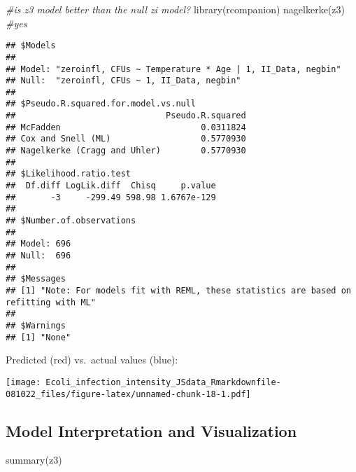 \documentclass[
]{article}
\newenvironment{Shaded}{\begin{snugshade}}{\end{snugshade}}
\newcommand{\CommentTok}[1]{\textcolor[rgb]{0.56,0.35,0.01}{\textit{#1}}}
\newcommand{\FunctionTok}[1]{\textcolor[rgb]{0.00,0.00,0.00}{#1}}
\newcommand{\NormalTok}[1]{#1}
\begin{document}
\begin{Shaded}
\begin{Highlighting}[]
\CommentTok{\#is z3 model better than the null zi model?}
\FunctionTok{library}\NormalTok{(rcompanion)}
\FunctionTok{nagelkerke}\NormalTok{(z3) }\CommentTok{\#yes}
\end{Highlighting}
\end{Shaded}

\begin{verbatim}
## $Models
##                                                                 
## Model: "zeroinfl, CFUs ~ Temperature * Age | 1, II_Data, negbin"
## Null:  "zeroinfl, CFUs ~ 1, II_Data, negbin"                    
## 
## $Pseudo.R.squared.for.model.vs.null
##                              Pseudo.R.squared
## McFadden                            0.0311824
## Cox and Snell (ML)                  0.5770930
## Nagelkerke (Cragg and Uhler)        0.5770930
## 
## $Likelihood.ratio.test
##  Df.diff LogLik.diff  Chisq     p.value
##       -3     -299.49 598.98 1.6767e-129
## 
## $Number.of.observations
##           
## Model: 696
## Null:  696
## 
## $Messages
## [1] "Note: For models fit with REML, these statistics are based on refitting with ML"
## 
## $Warnings
## [1] "None"
\end{verbatim}

Predicted (red) vs.~actual values (blue):

\texttt{[image: Ecoli\_infection\_intensity\_JSdata\_Rmarkdownfile-081022\_files/figure-latex/unnamed-chunk-18-1.pdf]}

\hypertarget{model-interpretation-and-visualization}{%
\subsection{Model Interpretation and
Visualization}\label{model-interpretation-and-visualization}}

\begin{Shaded}
\begin{Highlighting}[]
\FunctionTok{summary}\NormalTok{(z3)}
\end{Highlighting}
\end{Shaded}
\end{document}

